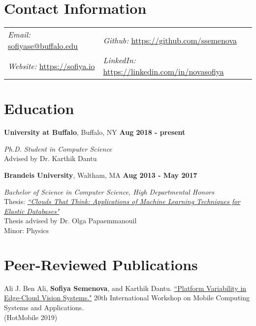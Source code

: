 \documentclass[margin,line]{res}
\begin{document}

\begin{resume}
\section{\sc Contact Information}
\vspace{.05in}
\begin{tabular}{@{}p{2.5in}p{4in}}
{\it Email:}  \href{sofiyase@buffalo.edu}{sofiyase@buffalo.edu} &  {\it Github:} \href{https://github.com/ssemenova}{https://github.com/ssemenova}\\ 
{\it Website:} \href{https://sofiya.io}{https://sofiya.io} & {\it LinkedIn:} \href{https://linkedin.com/in/novasofiya}{https://linkedin.com/in/novasofiya} \\ 
\end{tabular}


\section{\sc Education}
{\bf University at Buffalo}, Buffalo, NY   \hfill {\bf Aug 2018 - present}

\vspace{-.4cm}
{\em Ph.D. Student in Computer Science} \\
Advised by Dr. Karthik Dantu

{\bf Brandeis University}, Waltham, MA  \hfill {\bf Aug 2013 - May 2017}

\vspace{-.4cm}
{\em Bachelor of Science in Computer Science, High Departmental Honors} \\
Thesis: \textit{\href{https://sofiya.io/media/thesis.pdf}{``Clouds That Think: Applications of Machine Learning Techniques for Elastic Databases"}} \\
Thesis advised by Dr. Olga Papaemmanouil \\
Minor: Physics




\section{\sc Peer-Reviewed Publications}
     Ali J. Ben Ali, \textbf{Sofiya Semenova}, and Karthik Dantu. \href{https://dl.acm.org/doi/10.1145/3301293.3309555}{``Platform Variability in Edge-Cloud Vision Systems."} 20th International Workshop on Mobile Computing Systems and Applications. \\(HotMobile 2019)
     

\end{resume}
\end{document}
